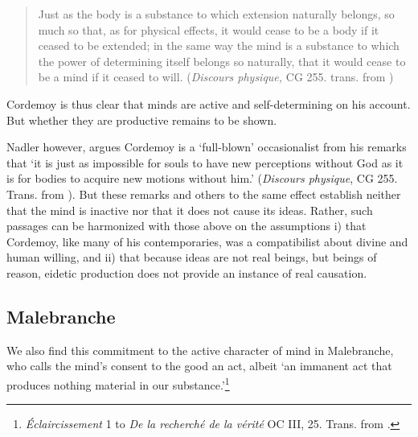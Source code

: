 	\begin{quote}
		Just as the body is a substance to which extension naturally belongs, so much so that, as for physical effects, it would cease to be a body if it ceased to be extended; in the same way the mind is a substance to which the power of determining itself belongs so naturally, that it would cease to be a mind if it ceased to will. (\emph{Discours physique,} CG 255. trans. from \autocite[47]{Nadler2005})
	\end{quote}

Cordemoy is thus clear that minds are active and self-determining on his account. But whether they are productive remains to be shown. 

Nadler however, argues Cordemoy is a `full-blown' occasionalist from his remarks that `it is just as impossible for souls to have new perceptions without God as it is for bodies to acquire new motions without him.' (\emph{Discours physique}, CG 255. Trans. from \autocite[50]{Nadler2005}). But these remarks and others to the same effect establish neither that the mind is inactive nor that it does not cause its ideas. Rather, such passages can be harmonized with those above on the assumptions i) that Cordemoy, like many of his contemporaries, was a compatibilist about divine and human willing, and ii) that because ideas are not real beings, but beings of reason, eidetic production does not provide an instance of real causation.



\subsection{Malebranche}
We also find this commitment to the active character of mind in Malebranche, who calls the mind's consent to the good an act, albeit `an immanent act that produces nothing material in our substance.'\footnote{\emph{Éclaircissement} 1 to \emph{De la recherché de la vérité} OC III, 25. Trans. from \autocite[52]{Nadler2005}.}

